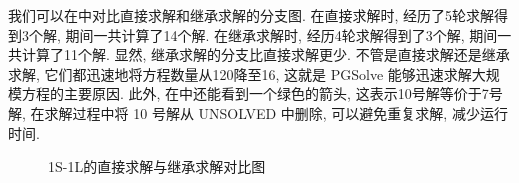 我们可以在中对比直接求解和继承求解的分支图. 在直接求解时, 经历了5轮求解得到3个解, 期间一共计算了14个解. 在继承求解时, 经历4轮求解得到了3个解, 期间一共计算了11个解. 显然, 继承求解的分支比直接求解更少. 不管是直接求解还是继承求解, 它们都迅速地将方程数量从120降至16, 这就是 PGSolve 能够迅速求解大规模方程的主要原因. 此外, 在中还能看到一个绿色的箭头, 这表示10号解等价于7号解, 在求解过程中将 10 号解从 UNSOLVED 中删除, 可以避免重复求解, 减少运行时间. 

\begin{figure}[htbp]
\centering
{}
\hfill
{}
\caption{1S-1L的直接求解与继承求解对比图} \label{sb1}
\end{figure}

